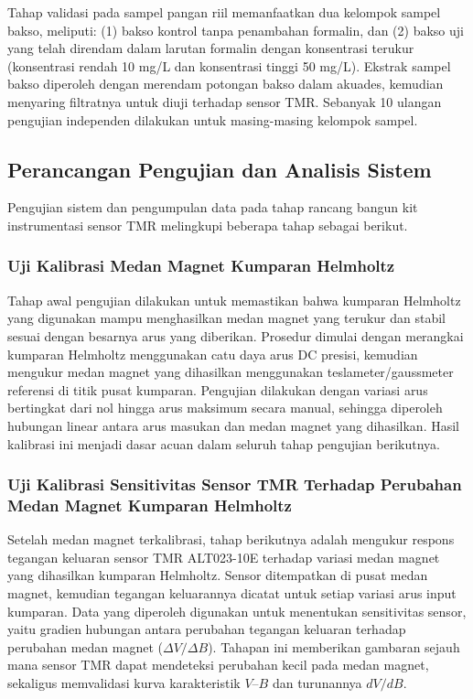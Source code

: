 Tahap validasi pada sampel pangan riil memanfaatkan dua kelompok sampel bakso, meliputi: (1) bakso kontrol tanpa penambahan formalin, dan (2) bakso uji yang telah direndam dalam larutan formalin dengan konsentrasi terukur (konsentrasi rendah 10 mg/L dan konsentrasi tinggi 50 mg/L). Ekstrak sampel bakso diperoleh dengan merendam potongan bakso dalam akuades, kemudian menyaring filtratnya untuk diuji terhadap sensor TMR. Sebanyak 10 ulangan pengujian independen dilakukan untuk masing-masing kelompok sampel.

\subsection{Perancangan Pengujian dan Analisis Sistem}
Pengujian sistem dan pengumpulan data pada tahap rancang bangun kit instrumentasi sensor TMR melingkupi beberapa tahap sebagai berikut.

\subsubsection{Uji Kalibrasi Medan Magnet Kumparan Helmholtz}
Tahap awal pengujian dilakukan untuk memastikan bahwa kumparan Helmholtz yang digunakan mampu menghasilkan medan magnet yang terukur dan stabil sesuai dengan besarnya arus yang diberikan. Prosedur dimulai dengan merangkai kumparan Helmholtz menggunakan catu daya arus DC presisi, kemudian mengukur medan magnet yang dihasilkan menggunakan teslameter/gaussmeter referensi di titik pusat kumparan. Pengujian dilakukan dengan variasi arus bertingkat dari nol hingga arus maksimum secara manual, sehingga diperoleh hubungan linear antara arus masukan dan medan magnet yang dihasilkan. Hasil kalibrasi ini menjadi dasar acuan dalam seluruh tahap pengujian berikutnya.

\subsubsection{Uji Kalibrasi Sensitivitas Sensor TMR Terhadap Perubahan Medan Magnet Kumparan Helmholtz}
Setelah medan magnet terkalibrasi, tahap berikutnya adalah mengukur respons tegangan keluaran sensor TMR ALT023-10E terhadap variasi medan magnet yang dihasilkan kumparan Helmholtz. Sensor ditempatkan di pusat medan magnet, kemudian tegangan keluarannya dicatat untuk setiap variasi arus input kumparan. Data yang diperoleh digunakan untuk menentukan sensitivitas sensor, yaitu gradien hubungan antara perubahan tegangan keluaran terhadap perubahan medan magnet ($\Delta V/\Delta B$). Tahapan ini memberikan gambaran sejauh mana sensor TMR dapat mendeteksi perubahan kecil pada medan magnet, sekaligus memvalidasi kurva karakteristik $V$--$B$ dan turunannya $dV/dB$.

